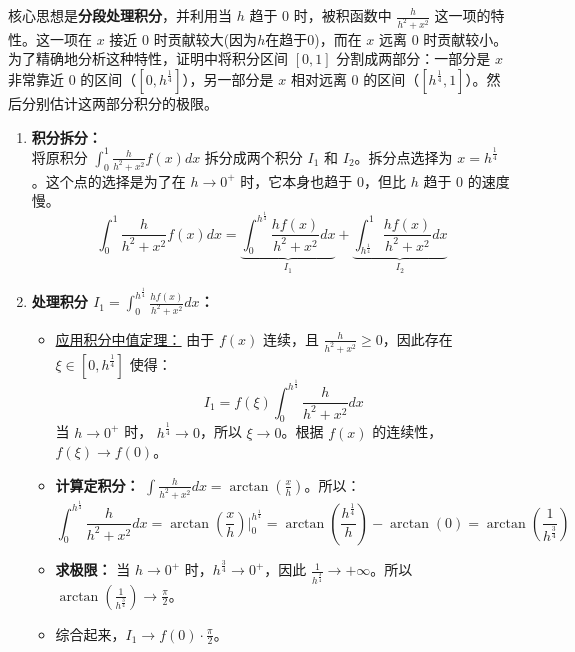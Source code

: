 \documentclass[lang=cn,newtx,10pt,scheme=chinese]{elegantbook}
\begin{document}
\begin{note}
    核心思想是\textbf{分段处理积分}，并利用当 $h$ 趋于 $0$ 时，被积函数中 $\frac{h}{h^2+x^2}$ 这一项的特性。这一项在 $x$ 接近 $0$ 时贡献较大(因为$h$在趋于$0$)，而在 $x$ 远离 $0$ 时贡献较小。为了精确地分析这种特性，证明中将积分区间 $[0,1]$ 分割成两部分：一部分是 $x$ 非常靠近 $0$ 的区间（$[0, h^{\frac{1}{4}}]$），另一部分是 $x$ 相对远离 $0$ 的区间（$[h^{\frac{1}{4}}, 1]$）。然后分别估计这两部分积分的极限。
\begin{enumerate}
    \item \textbf{积分拆分：} \\
    将原积分 $\int_{0}^{1} \frac{h}{h^2+x^2}f(x)dx$ 拆分成两个积分 $I_1$ 和 $I_2$。拆分点选择为 $x = h^{\frac{1}{4}}$。这个点的选择是为了在 $h \to 0^+$ 时，它本身也趋于 $0$，但比 $h$ 趋于 $0$ 的速度慢。
    $$\int_{0}^{1} \frac{h}{h^2+x^2}f(x)dx = \underbrace{\int_{0}^{h^{\frac{1}{4}}} \frac{hf(x)}{h^2+x^2}dx}_{I_1} + \underbrace{\int_{h^{\frac{1}{4}}}^{1} \frac{hf(x)}{h^2+x^2}dx}_{I_2}$$

    \item \textbf{处理积分 $I_1 = \int_{0}^{h^{\frac{1}{4}}} \frac{hf(x)}{h^2+x^2}dx$：}
    \begin{itemize}
        \item \underline{应用积分中值定理：} 由于 $f(x)$ 连续，且 $\frac{h}{h^2+x^2} \ge 0$，因此存在 $\xi \in [0, h^{\frac{1}{4}}]$ 使得：
        $$I_1 = f(\xi) \int_{0}^{h^{\frac{1}{4}}} \frac{h}{h^2+x^2}dx$$
        当 $h \to 0^+$ 时， $h^{\frac{1}{4}} \to 0$，所以 $\xi \to 0$。根据 $f(x)$ 的连续性，$f(\xi) \to f(0)$。
        \item \textbf{计算定积分：} $\int \frac{h}{h^2+x^2}dx = \arctan\left(\frac{x}{h}\right)$。所以：
        $$\int_{0}^{h^{\frac{1}{4}}} \frac{h}{h^2+x^2}dx = \arctan\left(\frac{x}{h}\right) \Big|_{0}^{h^{\frac{1}{4}}} = \arctan\left(\frac{h^{\frac{1}{4}}}{h}\right) - \arctan(0) = \arctan\left(\frac{1}{h^{\frac{3}{4}}}\right)$$
        \item \textbf{求极限：} 当 $h \to 0^+$ 时，$h^{\frac{3}{4}} \to 0^+$，因此 $\frac{1}{h^{\frac{3}{4}}} \to +\infty$。所以 $\arctan\left(\frac{1}{h^{\frac{3}{4}}}\right) \to \frac{\pi}{2}$。
        \item 综合起来，$I_1 \to f(0) \cdot \frac{\pi}{2}$。
    \end{itemize}


\end{enumerate}
\end{note}
\end{document}
